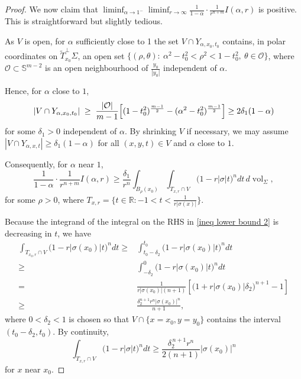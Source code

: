 \documentclass[10pt,a4paper]{amsart}
\begin{document}
\begin{proof}
We now claim that $\displaystyle \liminf_{\alpha \to 1^{-}} \liminf_{r \to \infty} \frac{1}{1-\alpha}\cdot\frac{1}{r^{n+m}} I(\alpha, r)$ is positive. This is straightforward but slightly tedious.

As $V$ is open, for $\alpha$ sufficiently close to 1 the set $V \cap Y_{\alpha, x_0, t_0}$ contains, in polar coordinates on $\widetilde{T}_{x_0}^{\perp} \Sigma$, an open set
$\{(\rho, \theta):\ \alpha^{2}-t_{0}^{2}<\rho^{2}<1-t_{0}^{2}, \ \theta\in\mathcal O\}$,
where $\mathcal O\subset\mathbb S^{m-2}$ is an open neighbourhood of $\frac{y_{0}}{|y_{0}|}$ independent of $\alpha$.

Hence, for $\alpha$ close to $1$,
$$
|V\cap Y_{\alpha, x_{0}, t_{0}}|
\;\ge\;
\frac{|\mathcal O|}{m-1}\Bigl[(1-t_{0}^{2})^{\frac{m-1}{2}}-(\alpha^{2}-t_{0}^{2})^{\frac{m-1}{2}}\Bigr]
\ge2 \delta_1(1-\alpha)
$$
for some $\delta_{1}>0$ independent of $\alpha$. By shrinking $V$ if necessary, we may assume $|V\cap Y_{\alpha, x, t}|\ge\delta_{1}(1-\alpha)$ for all $(x, y, t)\in V$ and $\alpha$ close to $1$.

Consequently, for $\alpha$ near $1$,
\begin{equation}\label{ineq lower bound 2}
\frac{1}{1-\alpha}\cdot \frac{1}{r^{n+m}} I(\alpha, r) \ge \frac{\delta_{1}}{r^{n}}\int_{B_{\rho}(x_{0})} \int_{T_{x, r}\cap V} \bigl(1-r|\sigma| t\bigr)^{n}dt\, d\operatorname{vol}_{\Sigma},
\end{equation}
for some $\rho>0$, where $T_{x, r} =\{t\in \mathbb R: -1<t<\tfrac{1}{r|\sigma(x)|}\}$.

Because the integrand of the integral on the RHS in \eqref{ineq lower bound 2} is
decreasing in $t$, we have
\begin{equation}\label{ineq TV}
\begin{aligned}
\int_{T_{x_{0}, r} \cap V}
\bigl(1-r|\sigma(x_{0})| t\bigr)^{n} dt
\ge& \int_{ t_0 -\delta_{2}}^{ t_0 } \bigl(1-r|\sigma(x_{0})| t\bigr)^{n} dt \\
\ge& \int_{ -\delta_{2}}^{0} \bigl(1-r|\sigma(x_{0})| t\bigr)^{n} dt \\
=& \frac{1}{r|\sigma(x_{0})|(n+1)}
\left[\bigl(1+r|\sigma(x_{0})|\delta_{2}\bigr)^{n+1}-1\right]\\
\ge& \frac{\delta_2^{n+1}r^n|\sigma(x_0)|^{n}}{n+1},
\end{aligned}
\end{equation}
where $0<\delta_{2}<1$ is chosen so that $V \cap \{x=x_{0}, y=y_{0}\}$ contains the interval
$(t_{0}-\delta_{2}, t_{0})$.
By continuity,
$$
\int_{T_{x, r} \cap V}
\bigl(1-r|\sigma| t\bigr)^{n} dt
\ge\frac{\delta_{2}^{\, n+1} r^{n}}{2(n+1)} |\sigma(x_{0})|^{n}
$$
for $x$ near $x_{0}$.


\end{proof}
\end{document}
